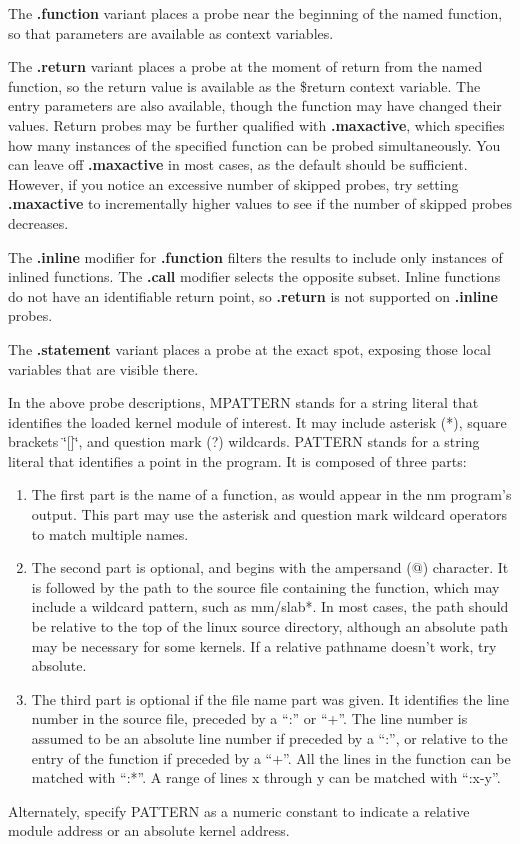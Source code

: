 \documentclass[twoside,english]{article}
\begin{document}
The \textbf{.function} variant places a probe near the beginning of the named
function, so that parameters are available as context variables. 

The \textbf{.return} variant places a probe at the moment of return from the named
function, so the return value is available as the \$return context variable.
The entry parameters are also available, though the function may have changed
their values.  Return probes may be further qualified with \textbf{.maxactive}, 
which specifies how many instances of the specified function can be probed simultaneously.
You can leave off \textbf{.maxactive} in most cases, as the default should be sufficient.
However, if you notice an excessive number of skipped probes, try setting \textbf{.maxactive}
to incrementally higher values to see if the number of skipped probes decreases.

The \textbf{.inline} modifier for \textbf{.function} filters the results to include only 
instances of inlined functions. The \textbf{.call} modifier selects the opposite subset.
Inline functions do not have an identifiable return point, so \textbf{.return}
is not supported on \textbf{.inline} probes.

The \textbf{.statement} variant places a probe at the exact spot, exposing those local
variables that are visible there.

In the above probe descriptions, MPATTERN stands for a string literal
that identifies the loaded kernel module of interest. It may include asterisk
({*}), square brackets \char`\"{}{[}]\char`\"{}, and question mark (?) wildcards.
PATTERN stands for a string literal that identifies a point in the program.
It is composed of three parts:

\begin{enumerate}
\item The first part is the name of a function, as would appear in the nm program's
output. This part may use the asterisk and question mark wildcard operators
to match multiple names.
\item The second part is optional, and begins with the ampersand (@) character.
It is followed by the path to the source file containing the function,
which may include a wildcard pattern, such as mm/slab{*}.
In most cases, the path should be relative to the top of the
linux source directory, although an absolute path may be necessary for some kernels.
If a relative pathname doesn't work, try absolute.
\item The third part is optional if the file name part was given. It identifies
the line number in the source file, preceded by a ``:'' or ``+''.   
The line number is assumed to be an
absolute line number if preceded by a ``:'', or relative to the entry of
the function if preceded by a ``+''.
All the lines in the function can be matched with ``:*''.
A range of lines x through y can be matched with ``:x-y''.

\end{enumerate}
Alternately, specify PATTERN as a numeric constant to indicate a relative
module address or an absolute kernel address.
\end{document}
